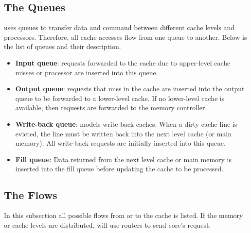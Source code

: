 \subsection{The Queues}
\label{sec:queue}

\SIM uses queues to transfer data and command between different cache levels
and processors. Therefore, all cache accesses flow from one queue to another.
Below is the list of queues and their description.

\begin{itemize}
  \item \textbf{Input queue}: requests forwarded to the cache due to upper-level 
		cache misses or processor are inserted into this queue.

  \item \textbf{Output queue}: requests that miss in the cache are inserted into the
  output queue to be forwarded to a lower-level cache. If no lower-level cache
  is available, then requests are forwarded to the memory controller.

  \item \textbf{Write-back queue}: \SIM models write-back caches. When a dirty cache
  line is evicted, the line must be written back into the next level cache (or
  main memory). All write-back requests are initially inserted into this queue.

  \item \textbf{Fill queue}: Data returned from the next level cache or main memory 
  is inserted into the fill queue before updating the cache to be processed.

  
\end{itemize}

\subsection{The Flows}
\label{sec:cache-flow}
In this subsection all possible flows from or to the cache is listed. If the memory or cache
levels are distributed, \SIM will use routers to send core's request. 

